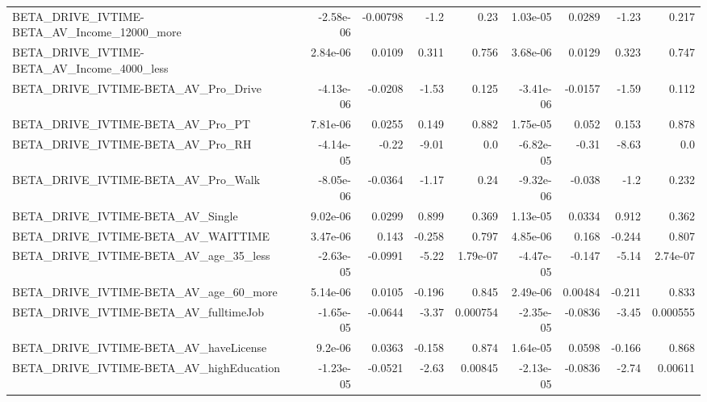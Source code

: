 \begin{tabular}{lrrrrrrrr}
BETA\_DRIVE\_IVTIME-BETA\_AV\_Income\_12000\_more        &   -2.58e-06 &     -0.00798 &      -1.2 &     0.23 &   1.03e-05 &      0.0289 &        -1.23 &         0.217 \\
BETA\_DRIVE\_IVTIME-BETA\_AV\_Income\_4000\_less         &    2.84e-06 &       0.0109 &     0.311 &    0.756 &   3.68e-06 &      0.0129 &        0.323 &         0.747 \\
BETA\_DRIVE\_IVTIME-BETA\_AV\_Pro\_Drive                &   -4.13e-06 &      -0.0208 &     -1.53 &    0.125 &  -3.41e-06 &     -0.0157 &        -1.59 &         0.112 \\
BETA\_DRIVE\_IVTIME-BETA\_AV\_Pro\_PT                   &    7.81e-06 &       0.0255 &     0.149 &    0.882 &   1.75e-05 &       0.052 &        0.153 &         0.878 \\
BETA\_DRIVE\_IVTIME-BETA\_AV\_Pro\_RH                   &   -4.14e-05 &        -0.22 &     -9.01 &      0.0 &  -6.82e-05 &       -0.31 &        -8.63 &           0.0 \\
BETA\_DRIVE\_IVTIME-BETA\_AV\_Pro\_Walk                 &   -8.05e-06 &      -0.0364 &     -1.17 &     0.24 &  -9.32e-06 &      -0.038 &         -1.2 &         0.232 \\
BETA\_DRIVE\_IVTIME-BETA\_AV\_Single                   &    9.02e-06 &       0.0299 &     0.899 &    0.369 &   1.13e-05 &      0.0334 &        0.912 &         0.362 \\
BETA\_DRIVE\_IVTIME-BETA\_AV\_WAITTIME                 &    3.47e-06 &        0.143 &    -0.258 &    0.797 &   4.85e-06 &       0.168 &       -0.244 &         0.807 \\
BETA\_DRIVE\_IVTIME-BETA\_AV\_age\_35\_less              &   -2.63e-05 &      -0.0991 &     -5.22 & 1.79e-07 &  -4.47e-05 &      -0.147 &        -5.14 &      2.74e-07 \\
BETA\_DRIVE\_IVTIME-BETA\_AV\_age\_60\_more              &    5.14e-06 &       0.0105 &    -0.196 &    0.845 &   2.49e-06 &     0.00484 &       -0.211 &         0.833 \\
BETA\_DRIVE\_IVTIME-BETA\_AV\_fulltimeJob              &   -1.65e-05 &      -0.0644 &     -3.37 & 0.000754 &  -2.35e-05 &     -0.0836 &        -3.45 &      0.000555 \\
BETA\_DRIVE\_IVTIME-BETA\_AV\_haveLicense              &     9.2e-06 &       0.0363 &    -0.158 &    0.874 &   1.64e-05 &      0.0598 &       -0.166 &         0.868 \\
BETA\_DRIVE\_IVTIME-BETA\_AV\_highEducation            &   -1.23e-05 &      -0.0521 &     -2.63 &  0.00845 &  -2.13e-05 &     -0.0836 &        -2.74 &       0.00611 \\

\end{tabular}
